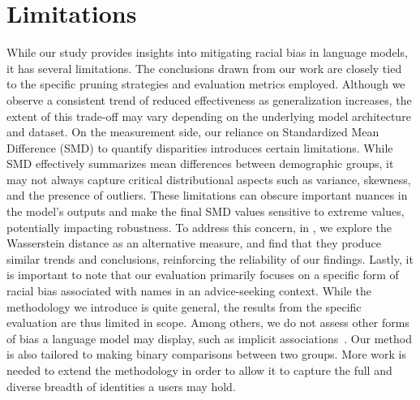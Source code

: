 \documentclass[11pt]{article}
\begin{document}
\section{Limitations}

While our study provides insights into mitigating racial bias in language models, it has several limitations.
The conclusions drawn from our work are closely tied to the specific pruning strategies and evaluation metrics employed. Although we observe a consistent trend of reduced effectiveness as generalization increases, the extent of this trade-off may vary depending on the underlying model architecture and dataset. 
On the measurement side, our reliance on Standardized Mean Difference (SMD) to quantify disparities introduces certain limitations. While SMD effectively summarizes mean differences between demographic groups, it may not always capture critical distributional aspects such as variance, skewness, and the presence of outliers. These limitations can obscure important nuances in the model’s outputs and make the final SMD values sensitive to extreme values, potentially impacting robustness. 
To address this concern, in , we explore the Wasserstein distance as an alternative measure, and find that they produce similar trends and conclusions, reinforcing the reliability of our findings.
Lastly, it is important to note that our evaluation primarily focuses on a specific form of racial bias associated with names in an advice-seeking context. While the methodology we introduce is quite general, the results from the specific evaluation are thus limited in scope. Among others, we do not assess other forms of bias a language model may display, such as implicit associations~\cite{kotek2023gender}. Our method is also tailored to making binary comparisons between two groups. More work is needed to extend the methodology in order to allow it to capture the full and diverse breadth of identities a users may hold.


\printbibliography

\newpage
\appendix

\end{document}
